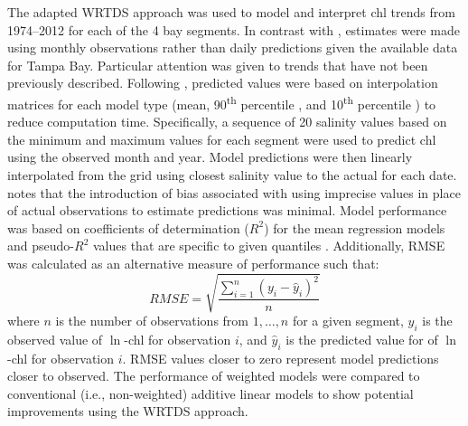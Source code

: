 \documentclass[letterpaper,12pt,oneside]{article}\usepackage[]{graphicx}\usepackage[]{color}
\newcommand{\nine}{90\textsuperscript{th} percentile }
\newcommand{\ten}{10\textsuperscript{th} percentile }
\begin{document}
The adapted \ac{WRTDS} approach was used to model and interpret \ac{chl} trends from 1974--2012 for each of the 4 bay segments.  In contrast with \citep{Hirsch10}, estimates were made using monthly observations rather than daily predictions given the available data for Tampa Bay.  Particular attention was given to trends that have not been previously described.  Following \citet{Hirsch10}, predicted values were based on interpolation matrices for each model type (mean, \nine, and \ten) to reduce computation time.  Specifically, a sequence of 20 salinity values based on the minimum and maximum values for each segment were used to predict \ac{chl} using the observed month and year.  Model predictions were then linearly interpolated from the grid using closest salinity value to the actual for each date.  \citet{Hirsch10} notes that the introduction of bias associated with using imprecise values in place of actual observations to estimate predictions was minimal.  Model performance was based on coefficients of determination ($R^2$) for the mean regression models and pseudo-$R^2$ values that are specific to given quantiles \citep{Koenker99}.  Additionally, \ac{RMSE} was calculated as an alternative measure of performance such that:
\begin{equation}
RMSE = \sqrt {{\frac{{\sum\limits_{{i = 1}}^n {{{\left( {{y_i} - {{\hat{y}}_i}} \right)}^2}} }}{{n}}}}
\end{equation}
\noindent where $n$ is the number of observations from $1,\ldots,n$ for a given segment, $y_i$ is the observed value of $\ln$-\ac{chl} for observation $i$, and ${\hat{y}}_i$ is the predicted value for of $\ln$-\ac{chl} for observation $i$.  \ac{RMSE} values closer to zero represent model predictions closer to observed. The performance of weighted models were compared to conventional (i.e., non-weighted) additive linear models to show potential improvements using the \ac{WRTDS} approach.   
\end{document}
